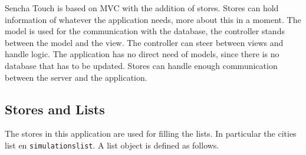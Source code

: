 Sencha Touch is based on MVC with the addition of stores. Stores can hold information of whatever the application needs, more about this in a moment. The model is used for the communication with the database, the controller stands between the model and the view. The controller can steer between views and handle logic. The application has no direct need of models, since there is no database that has to be updated. Stores can handle enough communication between the server and the application. 

\subsection{Stores and Lists}
\label{sec:storelist}
The stores in this application are used for filling the lists. In particular the cities list en \texttt{simulationslist}. A list object is defined as follows.

